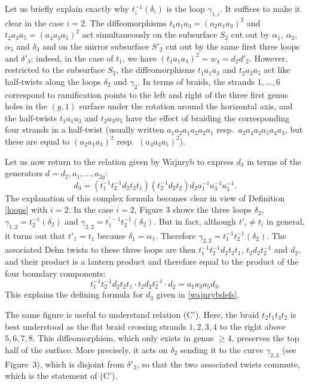 \documentclass[a4paper,10pt,reqno]{amsart}
\begin{document}
\vspace{.3cm}
Let us briefly explain exactly why $t_i^{-1}(\delta_i)$ is the loop $\gamma_{1,i}$. It suffices to make
it clear in the case $i=2$. The diffeomorphisms $t_1a_1a_3=(a_2a_1a_3)^2$ and
$t_2a_3a_5=(a_4a_3a_5)^2$ act simultaneously on the subsurface $S_2$ cut out by $\alpha_1$, $\alpha_3$, $\alpha_5$ 
and $\delta_3$ and on the mirror subsurface $S'_2$ cut out by the same first three loops and $\delta'_3$; indeed,
in the case of $t_1$, we have $(t_1a_1a_3)^2=w_4=d_2d'_2$. However, restricted to the subsurface $S_2$,
the diffeomorphisms $t_1a_1a_3$ and $t_2a_3a_5$ act like half-twists along the loops $\delta_2$
and $\gamma_2$. In terms of braids, the strands $1,\ldots,6$ correspond to ramification points to the left 
and right of the three first genus holes in the $(g,1)$ surface under the rotation around the horizontal axis, 
and the half-twists $t_1a_1a_3$ and $t_2a_3a_5$ have the effect of braiding the corresponding four strands
in a half-twist (usually written $a_1a_2a_1a_3a_2a_1$ resp.~$a_3a_4a_3a_5a_4a_3$, but these 
are equal to $(a_2a_1a_3)^2$ resp.~$(a_4a_3a_5)^2$). 


\vspace{.3cm}
Let us now return to the relation given by Wajnryb to express $d_3$ in
terms of the generators $d=d_2,a_1,\ldots,a_{2g}$:
$$d_3=(t_1^{-1}t_2^{-1}d_2t_2t_1)(t_2^{-1}d_2t_2)d_2a_1^{-1}a_3^{-1}a_5^{-1}.$$
The explanation of this complex formula becomes clear in view of 
Definition \ref{loops} with $i=2$.  In the case $i=2$, Figure 3 shows
the three loops $\delta_2$, $\gamma_{1,2}=t_2^{-1}(\delta_2)$ and
$\gamma_{2,2}=t_1^{\prime -1}t_2^{-1}(\delta_2)$. But in fact, although $t'_i\ne t_i$ in
general, it turns out that $t'_1=t_1$ because $\delta_1=\alpha_1$. Therefore
$\gamma_{2,2}=t_1^{-1}t_2^{-1}(\delta_2)$. The associated Dehn twists to these three
loops are then $t_1^{-1}t_2^{-1}d_2t_2t_1$, $t_2d_2t_2^{-1}$ and $d_2$,
and their product is a lantern product and therefore equal to the product
of the four boundary components:
$$t_1^{-1}t_2^{-1}d_2t_2t_1\cdot t_2d_2t_2^{-1}\cdot d_2=a_1a_3a_5d_3.$$
This explains the defining formula for $d_3$ given in 
\eqref{wajnrybdefs}.
 
\vspace{.2cm} The same figure is useful to understand relation (C$'$). 
Here, the braid $t_2t_1t_3t_2$ is best understood as
the flat braid crossing strands $1,2,3,4$ to the right above $5,6,7,8$. This
diffeomorphism, which only exists in genus $\ge 4$, preserves the top half
of the surface. More precisely, it acts on $\delta_2$ sending it to the 
curve $\gamma_{2,3}$ (see Figure~3), which is disjoint from 
$\delta'_2$, so that the two associated twists commute, 
which is the statement of (C$'$). 
\end{document}
